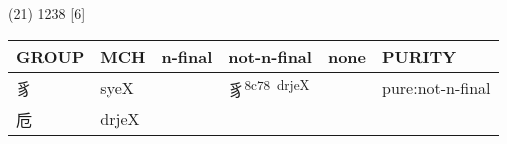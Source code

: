 \documentclass[14pt,a4paper]{scrartcl}
\begin{document}
(21) 1238 {[}6{]}

\begin{longtable}[c]{@{}llllll@{}}
\toprule
\begin{minipage}[b]{0.14\columnwidth}\raggedright\strut
GROUP
\strut\end{minipage} &
\begin{minipage}[b]{0.14\columnwidth}\raggedright\strut
MCH
\strut\end{minipage} &
\begin{minipage}[b]{0.14\columnwidth}\raggedright\strut
n-final
\strut\end{minipage} &
\begin{minipage}[b]{0.14\columnwidth}\raggedright\strut
not-n-final
\strut\end{minipage} &
\begin{minipage}[b]{0.14\columnwidth}\raggedright\strut
none
\strut\end{minipage} &
\begin{minipage}[b]{0.14\columnwidth}\raggedright\strut
PURITY
\strut\end{minipage}\tabularnewline
\midrule
\endhead
\begin{minipage}[t]{0.14\columnwidth}\raggedright\strut
豸
\strut\end{minipage} &
\begin{minipage}[t]{0.14\columnwidth}\raggedright\strut
syeX
\strut\end{minipage} &
\begin{minipage}[t]{0.14\columnwidth}\raggedright\strut
\strut\end{minipage} &
\begin{minipage}[t]{0.14\columnwidth}\raggedright\strut
豸\textsuperscript{8c78~drjeX}
\strut\end{minipage} &
\begin{minipage}[t]{0.14\columnwidth}\raggedright\strut
\strut\end{minipage} &
\begin{minipage}[t]{0.14\columnwidth}\raggedright\strut
pure:not-n-final
\strut\end{minipage}\tabularnewline
\begin{minipage}[t]{0.14\columnwidth}\raggedright\strut
卮
\strut\end{minipage} &
\begin{minipage}[t]{0.14\columnwidth}\raggedright\strut
drjeX
\strut\end{minipage} &
\begin{minipage}[t]{0.14\columnwidth}\raggedright\strut

\end{minipage}
\end{longtable}
\end{document}
